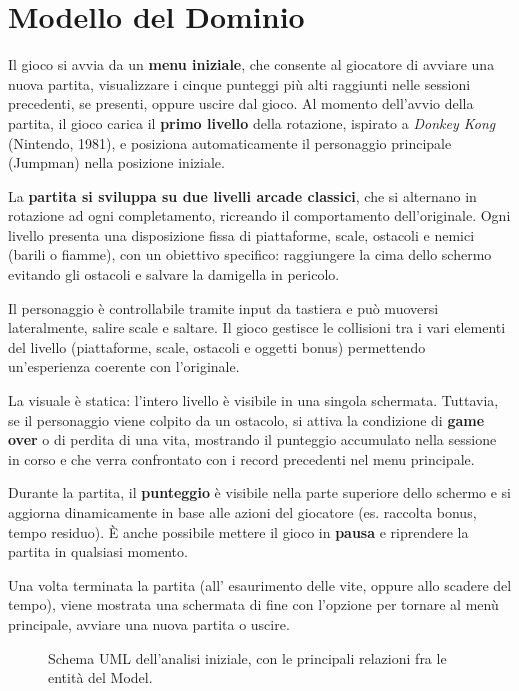 \documentclass[a4paper,12pt]{report}
\begin{document}
\newpage
\section{Modello del Dominio}

Il gioco si avvia da un \textbf{menu iniziale}, che consente al giocatore di avviare una nuova partita, visualizzare i cinque punteggi più alti raggiunti nelle sessioni
precedenti, se presenti, oppure uscire dal gioco. Al momento dell'avvio della partita, il gioco carica il \textbf{primo livello} della rotazione, ispirato a \textit{Donkey Kong} (Nintendo, 1981), e
posiziona automaticamente il personaggio principale (Jumpman) nella posizione iniziale.

La \textbf{partita si sviluppa su due livelli arcade classici}, che si alternano in rotazione ad ogni completamento, ricreando il comportamento dell'originale. Ogni livello
presenta una disposizione fissa di piattaforme, scale, ostacoli e nemici (barili o fiamme), con un obiettivo specifico: raggiungere la cima dello schermo evitando gli ostacoli e
salvare la damigella in pericolo.

Il personaggio è controllabile tramite input da tastiera e può muoversi lateralmente, salire scale e saltare. Il gioco gestisce le collisioni tra i vari elementi del livello
(piattaforme, scale, ostacoli e oggetti bonus) permettendo un'esperienza coerente con l'originale.

La visuale è statica: l'intero livello è visibile in una singola schermata. Tuttavia, se il personaggio viene colpito da un ostacolo, si attiva la condizione
di \textbf{game over} o di perdita di una vita, mostrando il punteggio accumulato nella sessione in corso e che verra confrontato con i record precedenti nel menu principale.

Durante la partita, il \textbf{punteggio} è visibile nella parte superiore dello schermo e si aggiorna dinamicamente in base alle azioni
del giocatore (es. raccolta bonus, tempo residuo). È anche possibile mettere il gioco in \textbf{pausa} e riprendere la partita in qualsiasi momento.

Una volta terminata la partita (all' esaurimento delle vite, oppure allo scadere del tempo), viene mostrata una schermata di fine con l'opzione per
tornare al menù principale, avviare una nuova partita o uscire.

\begin{figure}[H]
	\centering{}
	
	\caption{Schema UML dell'analisi iniziale, con le principali relazioni fra le entità del Model.}
	\label{img:model}
\end{figure}
\end{document}
